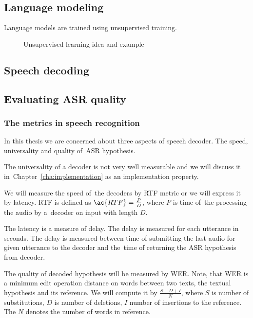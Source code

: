 \subsection{Language modeling}
\label{sub:lm}

Language models are trained using unsupervised training. 

\begin{figure}[!htp]
    \begin{center}
    
    \caption{Unsupervised learning idea and example}
    \label{fig:unsupervised} 
    \end{center}
\end{figure}

\subsection{Speech decoding}
\label{sub:decode}

\subsection{Evaluating \ac{ASR} quality}
\label{sub:eval}

\subsubsection*{The metrics in speech recognition}
\label{sub:the_metrics_in_speech_recognition}
In this thesis we are concerned about three aspects of speech decoder.
The speed, universality and quality of~\ac{ASR} hypothesis.

The universality of a decoder is not very well measurable and we will discuss it 
in~Chapter~\ref{cha:implementation} as an implementation property.

We will measure the speed of~the decoders by \acl{RTF} metric or we will express it by latency.
\ac{RTF} is defined as $\ac{RTF} = \frac{P}{D}$, where $P$ is time of~the processing the audio by a~decoder on input with length $D$. 

The latency is a measure of delay. The delay is measured for each utterance in seconds. 
The delay is measured between time of submitting the last audio for given utterance to the decoder and 
the~time of returning the \ac{ASR} hypothesis from decoder.

The quality of decoded hypothesis will be measured by \ac{WER}.
Note, that \ac{WER} is a minimum edit operation distance on words between two texts, the textual hypothesis
and its reference.
We will compute it by $\frac{S+D+I}{N}$, where $S$ is number of substitutions,
$D$ is number of deletions, $I$ number of insertions to the reference. 
The $N$ denotes the number of words in reference.

